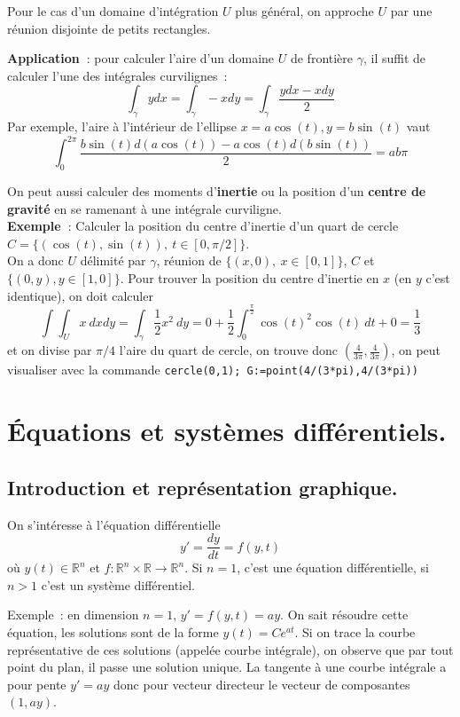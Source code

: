 \documentclass[a4paper,11pt]{article}
\begin{document}
\begin{giacjshere}
Pour le cas d'un domaine d'int\'egration $U$ plus g\'en\'eral, on approche $U$
par une r\'eunion disjointe de petits rectangles.

{\bf Application~}: pour calculer l'aire d'un domaine $U$ de fronti\`ere
$\gamma$,  il suffit de
calculer l'une des int\'egrales curvilignes~:
$$ \int_\gamma y dx= \int_\gamma -x dy = \int_\gamma \frac{y dx - x
  dy}{2}$$
Par exemple, l'aire \`a l'int\'erieur de l'ellipse $x=a\cos(t),
y=b\sin(t)$ vaut
$$ \int_0^{2\pi} \frac{b \sin(t) d(a\cos(t)) - a\cos(t)
  d(b\sin(t))}{2} = ab\pi $$

On peut aussi calculer des moments d'{\bf inertie} 
ou la position d'un {\bf centre de gravit\'e}
en se ramenant \`a une int\'egrale curviligne.\\
{\bf Exemple~}: Calculer la position du centre d'inertie d'un quart
de cercle $C=\{(\cos(t),\sin(t)), \ t \in [0,\pi/2]\}$.\\
On a donc $U$ d\'elimit\'e par $\gamma$, r\'eunion de $\{(x,0), \ x
\in [0,1]\} $, $C$ et $\{(0,y), y \in [1,0]\}$.
Pour trouver la position du centre
d'inertie en $x$ (en $y$ c'est identique), on doit calculer
$$ \int \int_U x \ dx dy = \int_\gamma \frac{1}{2} x^2 \ dy
= 0 + \frac{1}{2} \int_0^{\frac{\pi}{2}} \cos(t)^2 \cos(t) \ dt + 0= \frac{1}{3}$$
et on divise par $\pi/4$ l'aire du quart de cercle, on trouve
donc $(\frac{4}{3\pi},\frac{4}{3\pi})$, on peut visualiser avec
la commande \verb|cercle(0,1); G:=point(4/(3*pi),4/(3*pi))|




\section{\'Equations et syst\`emes diff\'erentiels.} \label{sec:ode}

\subsection{Introduction et repr\'esentation graphique.}
On s'int\'eresse \`a l'\'equation diff\'erentielle
\begin{equation} \label{eq:diff}
 y'=\frac{dy}{dt}=f(y,t)
\end{equation}
o\`u $y(t) \in \mathbb{R}^n$ et $f: \mathbb{R}^n \times \mathbb{R} \rightarrow \mathbb{R}^n$.
Si $n=1$, c'est une \'equation diff\'erentielle, si $n>1$ c'est
un syst\`eme diff\'erentiel.

Exemple~: en dimension $n=1$, $y'=f(y,t)=ay$. On sait r\'esoudre cette
\'equation, les solutions sont de la forme $y(t)=Ce^{at}$. Si on trace
la courbe repr\'esentative de ces solutions (appel\'ee
courbe int\'egrale), on observe que par
tout point du plan, il passe une solution unique. La tangente
\`a une courbe int\'egrale a pour pente $y'=ay$ donc pour
vecteur directeur le vecteur de composantes $(1,ay)$.


\end{giacjshere}
\end{document}
